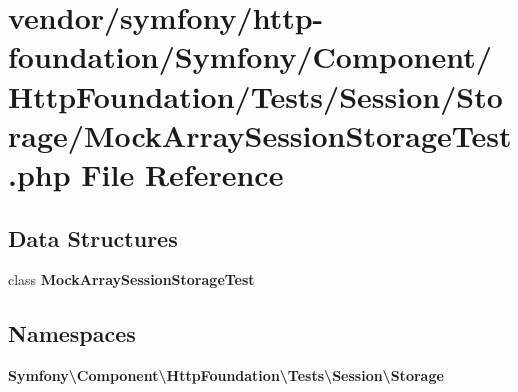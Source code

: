 \section{vendor/symfony/http-\/foundation/\+Symfony/\+Component/\+Http\+Foundation/\+Tests/\+Session/\+Storage/\+Mock\+Array\+Session\+Storage\+Test.php File Reference}
\label{_mock_array_session_storage_test_8php}
\subsection*{Data Structures}
\begin{DoxyCompactItemize}
\item 
class {\bf Mock\+Array\+Session\+Storage\+Test}
\end{DoxyCompactItemize}
\subsection*{Namespaces}
\begin{DoxyCompactItemize}
\item 
 {\bf Symfony\textbackslash{}\+Component\textbackslash{}\+Http\+Foundation\textbackslash{}\+Tests\textbackslash{}\+Session\textbackslash{}\+Storage}
\end{DoxyCompactItemize}
